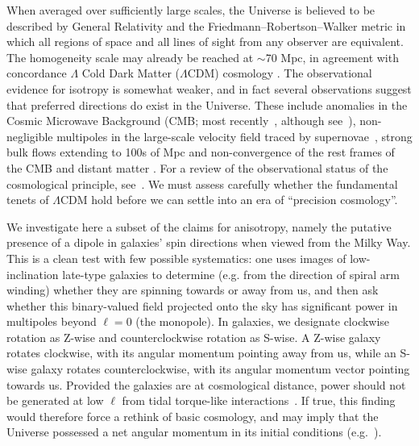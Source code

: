 \documentclass[fleqn,usenatbib,nofootinbib]{mnras}
\begin{document}
When averaged over sufficiently large scales, the Universe is believed to be described by General Relativity and the Friedmann--Robertson--Walker metric in which all regions of space and all lines of sight from any observer are equivalent. The homogeneity scale may already be reached at $\sim$70 Mpc, in agreement with concordance $\Lambda$ Cold Dark Matter ($\Lambda$CDM) cosmology \citep{homo_1,homo_4,homo_2,homo_3}. The observational evidence for isotropy is somewhat weaker, and in fact several observations suggest that preferred directions do exist in the Universe. These include anomalies in the Cosmic Microwave Background (CMB; most recently~\citealt{CMB_anisotropy}, although see~\citealt{Sravan}), non-negligible multipoles in the large-scale velocity field traced by supernovae~\citep{Basheer,Hu}, strong bulk flows extending to 100s of Mpc \citep{CF4} and non-convergence of the rest frames of the CMB and distant matter \citep{Rameez,Migkas,EB_1,EB_2,SN_1,SN_2}. For a review of the observational status of the cosmological principle, see~\citet{CP_review}. We must assess carefully whether the fundamental tenets of $\Lambda$CDM hold before we can settle into an era of ``precision cosmology''.

We investigate here a subset of the claims for anisotropy, namely the putative presence of a dipole in galaxies' spin directions when viewed from the Milky Way. This is a clean test with few possible systematics: one uses images of low-inclination late-type galaxies to determine (e.g. from the direction of spiral arm winding) whether they are spinning towards or away from us, and then ask whether this binary-valued field projected onto the sky has significant power in multipoles beyond $\ell=0$ (the monopole). In galaxies, we designate clockwise rotation as Z-wise and counterclockwise rotation as S-wise. A Z-wise galaxy rotates clockwise, with its angular momentum pointing away from us, while an S-wise galaxy rotates counterclockwise, with its angular momentum vector pointing towards us. Provided the galaxies are at cosmological distance, power should not be generated at low $\ell$ from tidal torque-like interactions~\citep{TTT}. If true, this finding would therefore force a rethink of basic cosmology, and may imply that the Universe possessed a net angular momentum in its initial conditions (e.g.~\citealt{ani_1,ani_2,ani_3}).
\end{document}
